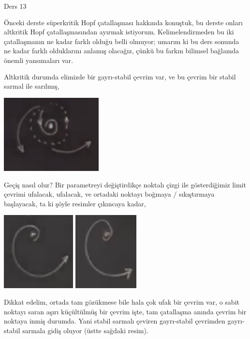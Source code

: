 \documentclass[12pt,fleqn]{article}\usepackage{../../common}
\begin{document}
Ders 13

Önceki derste süperkritik Hopf çatallaşması hakkında konuştuk, bu derste onları
altkritik Hopf çatallaşmasından ayırmak istiyorum. Kelimelendirmeden bu iki
çatallaşmanın ne kadar farklı olduğu belli olmuyor; umarım ki bu ders sonunda ne
kadar farklı olduklarını anlamış olacağız, çünkü bu farkın bilimsel bağlamda
önemli yansımaları var.

Altkritik durumda elimizde bir gayrı-stabil çevrim var, ve bu çevrim bir stabil
sarmal ile sarılmış,

\includegraphics[height=4cm]{13_01.png}

Geçiş nasıl olur? Bir parametreyi değiştirdikçe noktalı çizgi ile gösterdiğimiz
limit çevrimi ufalacak, ufalacak, ve ortadaki noktayı boğmaya / sıkıştırmaya
başlayacak, ta ki şöyle resimler çıkıncaya kadar,

\includegraphics[height=4cm]{13_02.png}
\includegraphics[height=4cm]{13_03.png}

Dikkat edelim, ortada tam gözükmese bile hala çok ufak bir çevrim var, o
sabit noktayı saran aşırı küçültülmüş bir çevrim işte, tam çatallaşma
anında çevrim bir noktaya inmiş durumda. Yani stabil sarmalı çeviren
gayrı-stabil çevrimden gayrı-stabil sarmala gidiş oluyor (üstte sağdaki
resim).
\end{document}
